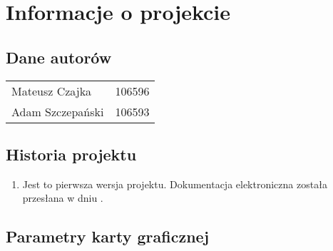 \newpage
\section{Informacje o projekcie}

\subsection{Dane autorów}

\begin{center}
\begin{tabular}{l r}
Mateusz Czajka & 106596 \\
Adam Szczepański & 106593
\end{tabular}
\end{center}

\subsection{Historia projektu}


\begin{center}
\begin{enumerate}
\item Jest to pierwsza wersja projektu. Dokumentacja elektroniczna została przesłana w dniu .
\end{enumerate}
\end{center}

\subsection{Parametry karty graficznej}


